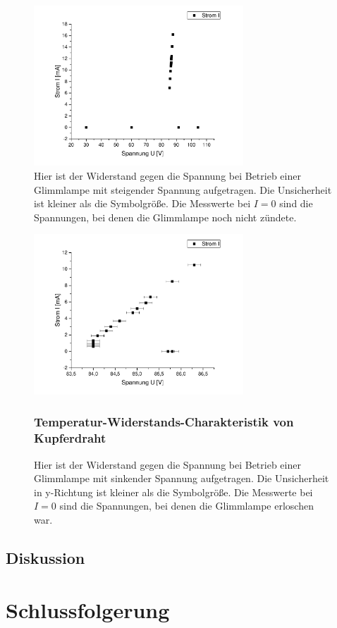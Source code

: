 \documentclass[
	a4paper,
	12pt,
	pagesize,
	ngerman
]{scrartcl}
\begin{document}
	\begin{figure}[H]
		\includegraphics[width=0.7\textwidth]{glimm_steig}
		\centering
		\caption{Hier ist der Widerstand gegen die Spannung bei Betrieb einer Glimmlampe mit steigender Spannung aufgetragen. Die Unsicherheit ist kleiner als die Symbolgröße. Die Messwerte bei $I=0$ sind die Spannungen, bei denen die Glimmlampe noch nicht zündete.}
		\label{glimm_steig}
		\centering
	\end{figure}
\begin{figure}[H]
	\includegraphics[width=0.7\textwidth]{glimm_fall}
	\centering
	\caption{Hier ist der Widerstand gegen die Spannung bei Betrieb einer Glimmlampe mit sinkender Spannung aufgetragen. Die Unsicherheit in y-Richtung ist kleiner als die Symbolgröße. Die Messwerte bei $I=0$ sind die Spannungen, bei denen die Glimmlampe erloschen war.}
	\label{glimm_fall}
	\centering
	\subsubsection{Temperatur-Widerstands-Charakteristik von Kupferdraht}
	
\end{figure}
	\subsection{Diskussion}
	
	\section{Schlussfolgerung}
	
\end{document}
